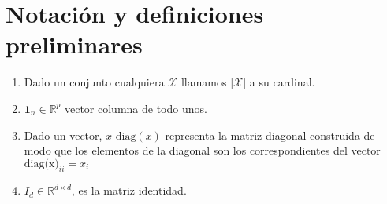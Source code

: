 \documentclass[10pt,a4paper]{article}
\begin{document}
\section{Notación y definiciones preliminares}
\begin{enumerate}
\item Dado un conjunto cualquiera $\mathcal{X}$ llamamos $\vert \mathcal{X} \vert$ a su cardinal.
\item $\mathbf{1}_n \in \mathbb{R}^p$ vector columna de todo unos. 
\item Dado un vector, $x$ $\text{diag}(x)$ representa la matriz diagonal construida de modo que los elementos de la diagonal son los correspondientes del vector $\text{diag(x)}_{ii} =x_i$

\item $I_d \in \mathbb{R}^{d\times d}$, es la matriz identidad.


\end{enumerate}
\end{document}
